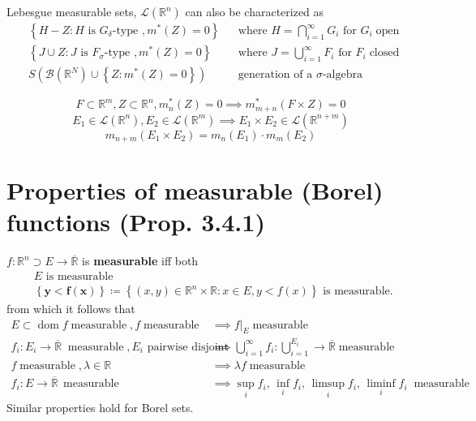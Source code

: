 \documentclass[letterpaper,11pt,intlimits,sumlimits]{amsart}
\newcommand{\closure}[1]{\overline{#1}}
\newcommand{\Borel}[1]{\mathcal{B}\left({#1}\right)}
\newcommand{\reals}{\mathbb{R}}
\newcommand{\keyphrase}[1]{\textbf{#1}}
\DeclareMathOperator{\open}{open}
\DeclareMathOperator{\dom}{dom}
\DeclareMathOperator{\closed}{closed}
\DeclareMathOperator{\measurable}{measurable}
\begin{document}
Lebesgue measurable sets, $\mathcal{L}\left( \reals^{n} \right)$
can also be characterized as
\begin{align*}
    &\left\{ H - Z
        : \text{$H$ is $G_{\delta}$-type },
        m^{*}\left( Z \right) = 0
    \right\}
    & &\text{where $H=\bigcap_{i=1}^{\infty} G_{i}$ for $G_{i}\open$}
    \tag{a} \\
    &\left\{ J \cup Z
        : \text{$J$ is $F_{\sigma}$-type },
        m^{*}\left( Z \right) = 0
    \right\}
    & &\text{where $J=\bigcup_{i=1}^{\infty} F_{i}$ for $F_{i}\closed$}
    \tag{b} \\
    &S\left(
        \Borel{\reals^{N}}
        \cup
        \left\{ Z :  m^{*}\left( Z \right) = 0 \right\}
    \right)
    & &\text{generation of a $\sigma$-algebra}
    \tag{c}
\end{align*}

\[
    F\subset\reals^{m}, Z\subset\reals^{n}, m^{*}_{n}\left( Z \right) = 0
    \implies m^{*}_{m+n} \left( F\times{}Z \right) = 0
\]
\[
    E_{1}\in\mathcal{L}\left( \reals^{n} \right),
    E_{2}\in\mathcal{L}\left( \reals^{m} \right)
    \implies
    E_{1}\times{}E_{2}\in\mathcal{L}\left( \reals^{n+m} \right)
\]
\[
    m_{n+m}\left( E_{1}\times{}E_{2} \right) =
    m_{n}\left( E_{1} \right)\cdot m_{m}\left( E_{2} \right)
\]

\section*{Properties of measurable (Borel) functions (Prop. 3.4.1)}

$f:\reals^{n}\supset{}E\to\closure{\reals}$ is \keyphrase{measurable}
iff both
\begin{align*}
    &\text{$E$ is measurable} \tag{a} \\
    &\boldsymbol{\left\{ y < f(x) \right\}} \coloneqq
    \left\{ (x,y)\in\reals^{n}\times\reals:x\in{}E, y < f(x) \right\}
    \text{ is measurable. } \tag{b}
\end{align*}
from which it follows that
\begin{align*}
    E\subset\dom{}f \measurable{}, f \measurable
    &\implies \left.f\right|_{E} \measurable
    \tag{3.4.1 i} \\
    f_{i}:E_{i}\to\closure{\reals}\;\measurable,E_{i}\text{ pairwise disjoint}
    &\implies \bigcup_{i=1}^{\infty} f_{i} 
    : \bigcup_{i=1}^{E_{i}} \to \closure{\reals} \measurable
    \tag{3.4.1 ii} \\
    f \measurable, \lambda\in\reals
    &\implies \lambda{}f \measurable
    \tag{3.4.1 iii} \\
    f_{i}:E\to\closure{\reals}\,\measurable &\implies 
    \sup_{i} f_{i},\, \inf_{i} f_{i},\, \limsup_{i} f_{i},\, \liminf_{i} f_{i}
    \;\measurable
    \tag{3.4.1 iv}
\end{align*}
Similar properties hold for Borel sets.
\end{document}
